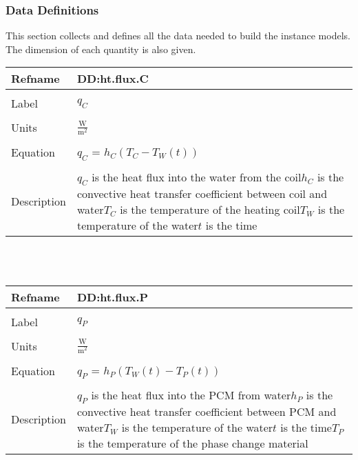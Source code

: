 \documentclass[12pt]{article}
\begin{document}
\subsubsection{Data Definitions}
\label{Sec:DataDefi}
This section collects and defines all the data needed to build the instance models. The dimension of each quantity is also given.
~\newline
\noindent \begin{minipage}{\textwidth}
\begin{tabular}{p{} p{}}
\toprule \textbf{Refname} & \textbf{DD:ht.flux.C}
\label{DD:ht.flux.C}
\\ \midrule \\
Label & $q_{C}$
\\ \midrule \\
Units & $\frac{\text{W}}{\text{m}^{2}}$
\\ \midrule \\
Equation & $q_{C}$ = $h_{C}(T_{C}-T_{W}(t))$
\\ \midrule \\
Description & $q_{C}$ is the heat flux into the water from the coil\newline$h_{C}$ is the convective heat transfer coefficient between coil and water\newline$T_{C}$ is the temperature of the heating coil\newline$T_{W}$ is the temperature of the water\newline$t$ is the time
\\ \bottomrule \end{tabular}
\end{minipage}\\
~\newline
\noindent \begin{minipage}{\textwidth}
\begin{tabular}{p{} p{}}
\toprule \textbf{Refname} & \textbf{DD:ht.flux.P}
\label{DD:ht.flux.P}
\\ \midrule \\
Label & $q_{P}$
\\ \midrule \\
Units & $\frac{\text{W}}{\text{m}^{2}}$
\\ \midrule \\
Equation & $q_{P}$ = $h_{P}(T_{W}(t)-T_{P}(t))$
\\ \midrule \\
Description & $q_{P}$ is the heat flux into the PCM from water\newline$h_{P}$ is the convective heat transfer coefficient between PCM and water\newline$T_{W}$ is the temperature of the water\newline$t$ is the time\newline$T_{P}$ is the temperature of the phase change material
\\ \bottomrule \end{tabular}
\end{minipage}\\
\end{document}
